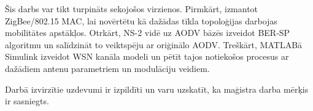 Šis darbs var tikt turpināts sekojošos virzienos. Pirmkārt, izmantot ZigBee/802.15 MAC, lai novērtētu kā dažādas tīkla topoloģijas darbojas mobilitātes apstākļos. Otrkārt, NS-2 vidē uz AODV bāzēs izveidot BER-SP algoritmu un salīdzināt to veiktspēju ar oriģinālo AODV. Treškārt, MATLABā Simulink izveidot WSN kanāla modeli un pētīt tajos notiekošos procesus ar dažādiem antenu parametriem un modulāciju veidiem.

Darbā izvirzītie uzdevumi ir izpildīti un varu uzskatīt, ka maģistra darba mērķis ir sasniegts.

